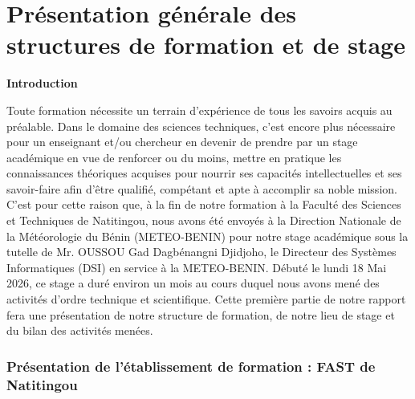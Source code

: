 \documentclass[a4paper,12pt]{report}
\theoremstyle{definition}
\begin{document}
	\begin{acronym}
		
	\end{acronym}
	
	\newpage
	
	
	\setcounter{page}{1}   %
	
	\part{Présentation générale des structures de formation et de stage}
	
	\begin{center}
		\textbf{{\LARGE Introduction}}
	\end{center}
	Toute formation nécessite un terrain d’expérience de tous les savoirs acquis au préalable. Dans le domaine des sciences techniques, c’est encore plus nécessaire pour un enseignant et/ou chercheur en devenir de prendre par un stage académique en vue de renforcer ou du moins, mettre en pratique les connaissances théoriques acquises pour nourrir ses capacités intellectuelles et ses savoir-faire afin d’être qualifié, compétant et apte à accomplir sa noble mission. C’est pour cette raison que, à la fin de notre formation à la Faculté des Sciences et Techniques de Natitingou, nous avons été envoyés à la Direction Nationale de la Météorologie du Bénin (METEO-BENIN) pour notre stage académique sous la tutelle de Mr. OUSSOU Gad Dagbénangni Djidjoho, le Directeur des Systèmes Informatiques (DSI) en service à la METEO-BENIN. Débuté le lundi 18 Mai 2026, ce stage a duré environ un mois au cours duquel nous avons mené des activités d’ordre technique et scientifique. Cette première partie de notre rapport fera une présentation de notre structure de formation, de notre lieu de stage et du bilan des activités menées.
	\section{Présentation de l’établissement de formation : FAST de Natitingou}
\end{document}
